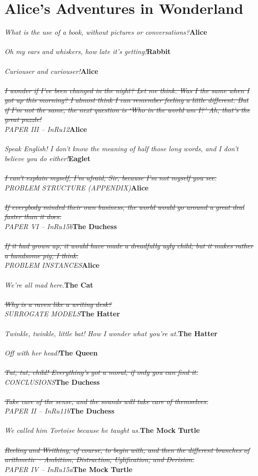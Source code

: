 \documentclass{hi-thesis}
\renewcommand{\quote}[2]{\noindent \emph{#2}\hfill{\bf #1}\\\\}
\begin{document}
\pagestyle{plain} 


\chapter*{Alice's Adventures in Wonderland}

\quote{Alice}{What is the use of a book, without pictures or conversations?} 
\quote{Rabbit}{Oh my ears and whiskers, how late it's getting!}
\quote{Alice}{Curiouser and curiouser!}
\quote{Alice}{\st{I wonder if I've been changed in the night? Let me think. Was 
I the same when I got up this morning? I almost think I can remember feeling a 
little different. But if I'm not the same, the next question is `Who in the 
world am I?' Ah, that's the great puzzle!}\\PAPER III -- InRu12}
\quote{Eaglet}{Speak English! I don't know the meaning of half those long 
words, and I don't believe you do either!}
\quote{Alice}{\st{I can't explain myself, I'm afraid, Sir, because I'm not myself you see.}\\PROBLEM STRUCTURE (APPENDIX)}
\quote{The Duchess}{\st{If everybody minded their own business, the world would 
go around a great deal faster than it does.} \\ PAPER VI -- InRu15b}
\quote{Alice}{\st{If it had grown up, it would have made a dreadfully ugly child; but it makes rather a handsome pig, I think.}\\PROBLEM INSTANCES}
\quote{The Cat}{We're all mad here.}
\quote{The Hatter}{ \st{Why is a raven like a writing desk?}\\SURROGATE MODELS}
\quote{The Hatter}{Twinkle, twinkle, little bat! How I wonder what you're at.}
\quote{The Queen}{Off with her head!}
\quote{The Duchess}{\st{Tut, tut, child! Everything's got a moral, if only you can find it.}\\CONCLUSIONS}
\quote{The Duchess}{\st{Take care of the sense, and the sounds will take care 
of themselves.}\\PAPER II -- InRu11b}
\quote{The Mock Turtle}{We called him Tortoise because he taught us.}
\quote{The Mock Turtle}{\st{Reeling and Writhing, of course, to begin with, 
and then the different branches of arithmetic -- Ambition, Distraction, 
Uglification, and Derision.}\\PAPER IV -- InRu15a}
\end{document}
